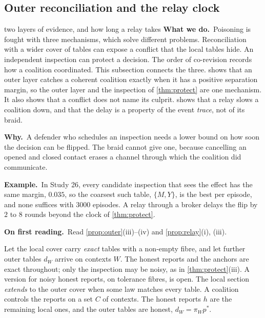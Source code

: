 \documentclass[11pt]{article}
\theoremstyle{definition}\newtheorem{definition}[theorem]{Definition}\newtheorem{remark}[theorem]{Remark}\newtheorem{example}[theorem]{Example}\newtheorem{problem}[theorem]{Open problem}\crefname{problem}{Problem}{Problems}
\newcommand{\rbwhat}{\textcolor{rbWhat}{\textbf{What we do.}}~}\newcommand{\rbwhy}{\par\smallskip\textcolor{rbWhy}{\textbf{Why.}}~}
\newcommand{\rbex}{\par\smallskip\textcolor{rbEx}{\textbf{Example.}}~}\newcommand{\rbbg}{\par\smallskip\textcolor{rbBg}{\textbf{Background.}}~}
\newcommand{\rbfirst}{\par\smallskip\textcolor{rbFirst}{\textbf{On first reading.}}~}
\begin{document}
\subsection{Outer reconciliation and the relay clock}\label{sec:outerrelay}
\begin{readerbox}{two layers of evidence, and how long a relay takes}
\rbwhat Poisoning is fought with three mechanisms, which solve different problems. Reconciliation with a wider cover of tables can expose a conflict that the local tables hide. An independent inspection can protect a decision. The order of co-revision records how a coalition coordinated. This subsection connects the three.  shows that an outer layer catches a coherent coalition exactly when it has a positive separation margin, so the outer layer and the inspection of \cref{thm:protect} are one mechanism. It also shows that a conflict does not name its culprit.  shows that a relay slows a coalition down, and that the delay is a property of the event \emph{trace}, not of its braid.
\rbwhy A defender who schedules an inspection needs a lower bound on how soon the decision can be flipped. The braid cannot give one, because cancelling an opened and closed contact erases a channel through which the coalition did communicate.
\rbex In Study 26, every candidate inspection that sees the effect has the same margin, $0.035$, so the coarsest such table, $\{M,Y\}$, is the best per episode, and none suffices with $3000$ episodes. A relay through a broker delays the flip by $2$ to $8$ rounds beyond the clock of \cref{thm:protect}.
\rbfirst Read \cref{prop:outer}(iii)--(iv) and \cref{prop:relay}(i), (iii).
\end{readerbox}

Let the local cover carry \emph{exact} tables with a non-empty fibre, and let further outer tables $d_W$ arrive on contexts $W$. The honest reports and the anchors are exact throughout; only the inspection may be noisy, as in \cref{thm:protect}(iii). A version for noisy honest reports, on tolerance fibres, is open. The local section \emph{extends} to the outer cover when some law matches every table. A coalition controls the reports on a set $C$ of contexts. The honest reports $h$ are the remaining local ones, and the outer tables are honest, $d_W=\pi_Wp^\ast$.
\end{document}

